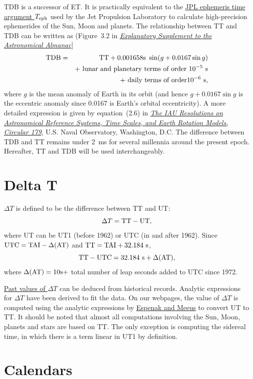 \documentclass[12pt]{article}
\newcommand \beq {\begin{equation}}
\newcommand \eeq {\end{equation}}
\newcommand \beqn {\begin{eqnarray}}
\newcommand \eeqn {\end{eqnarray}}
\newcommand{\expl}{\href{http://www.uscibooks.com/urban.htm}{\it Explanatory Supplement to the Astronomical Almanac}}
\newcommand{\kaplan}{\href{http://aa.usno.navy.mil/publications/docs/Circular_179.pdf}{\it The IAU Resolutions on Astronomical Reference Systems, Time Scales, and Earth Rotation Models, Circular 179}}
\begin{document}
TDB is a successor of ET. It is practically equivalent to the 
\href{https://en.wikipedia.org/wiki/Ephemeris_time#JPL_ephemeris_time_argument_Teph}{JPL ephemeris time argument $T_{\rm eph}$} 
used by the Jet Propulsion Laboratory to calculate high-precision ephemerides of 
the Sun, Moon and planets. The relationship between TT and TDB 
can be written as (Figure~3.2 in \expl ] 
\beqn
  {\rm TDB} &=& {\rm TT} + 0.001658{\rm s}~\sin(g + 0.0167\sin g) \cr 
&& + \mbox{ lunar and planetary terms of order } 10^{-5}~{\rm s} \cr 
&& + \mbox{ daily terms of order} 10^{-6}~{\rm s} , 
\eeqn
where $g$ is the mean anomaly of Earth in its orbit (and hence $g+0.0167\sin g$ is the 
eccentric anomaly since 0.0167 is Earth's orbital eccentricity). 
A more detailed expression is given by equation~(2.6) in 
\kaplan, U.S. Naval Observatory, Washington, D.C. The difference 
between TDB and TT remains under 2~ms for several millennia around the 
present epoch. Hereafter, TT and TDB will be used interchangeably.

\section{Delta T}
\label{sec:DeltaT}

$\Delta T$ is defined to be the difference between TT and UT:
\beq
  \Delta T = {\rm TT - UT} ,
\label{def:DeltaT}
\eeq
where UT can be UT1 (before 1962) or UTC (in and after 1962). Since 
${\rm UTC = TAI} - \Delta ({\rm AT})$ and ${\rm TT = TAI + 32.184~s}$, 
\beq
  {\rm TT - UTC = 32.184~s} + \Delta ({\rm AT}) ,
\eeq
where $\Delta ({\rm AT})=10{\rm s}+$ total number of leap seconds added to UTC since 1972. 

\href{https://eclipse.gsfc.nasa.gov/LEcat5/deltat.html}{Past values of $\Delta T$} 
can be deduced from historical records. Analytic expressions for $\Delta T$ 
have been derived to fit the data. On our webpages, the value of 
$\Delta T$ is computed using the analytic expressions by 
\href{https://eclipse.gsfc.nasa.gov/SEcat5/deltatpoly.html}{Espenak and Meeus} 
to convert UT to TT. It should be noted that almost all computations involving 
the Sun, Moon, planets and stars are based on TT. The only exception is 
computing the sidereal time, in which there is a term linear in UT1 by 
definition.

\section{Calendars}
\end{document}

